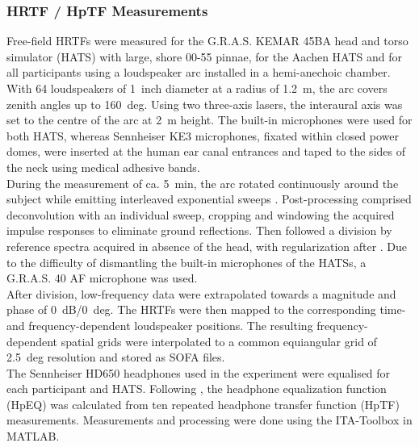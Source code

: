\documentclass[conference]{IEEEtran}
\def\NewL{\\\noindent\hspace*{5mm}}
\begin{document}
\subsubsection{HRTF / HpTF Measurements}
Free-field HRTFs were measured for the G.R.A.S. KEMAR 45BA head and torso simulator (HATS) with large, shore 00-55 pinnae, for the Aachen HATS \cite{schmitz1995_KKac} and for all participants using a loudspeaker arc installed in a hemi-anechoic chamber. With 64 loudspeakers of 1~inch diameter at a radius of 1.2~m, the arc covers zenith angles up to 160~deg. Using two three-axis lasers, the interaural axis was set to the centre of the arc at 2~m height. The built-in microphones were used for both HATS, whereas Sennheiser KE3 microphones, fixated within closed power domes, were inserted at the human ear canal entrances and taped to the sides of the neck using medical adhesive bands.
\NewL During the measurement of ca. 5~min, the arc rotated continuously around the subject \cite{richter2019_influence} while emitting interleaved exponential sweeps \cite{majdak2007_mesm,dietrich2013_optMesm}.
Post-processing comprised deconvolution with an individual sweep, cropping and windowing the acquired impulse responses to eliminate ground reflections.
Then followed a division by reference spectra acquired in absence of the head, with regularization after \cite{kirkeby1998_reg}.
Due to the difficulty of dismantling the built-in microphones of the HATSs, a G.R.A.S. 40 AF microphone was used.
\NewL After division, low-frequency data were extrapolated towards a magnitude and phase of 0~dB/0~deg.
The HRTFs were then mapped to the corresponding time- and frequency-dependent loudspeaker positions. The resulting frequency-dependent spatial grids were interpolated to a common equiangular grid of 2.5~deg resolution and stored as SOFA files.
\NewL  The Sennheiser HD650 headphones used in the experiment were equalised for each participant and HATS. Following \cite{masiero2011_HpTF}, the headphone equalization function (HpEQ) was calculated from ten repeated headphone transfer function (HpTF) measurements.
Measurements and processing were done using the ITA-Toolbox \cite{ITA-Toolbox_2017} in MATLAB.
\end{document}
